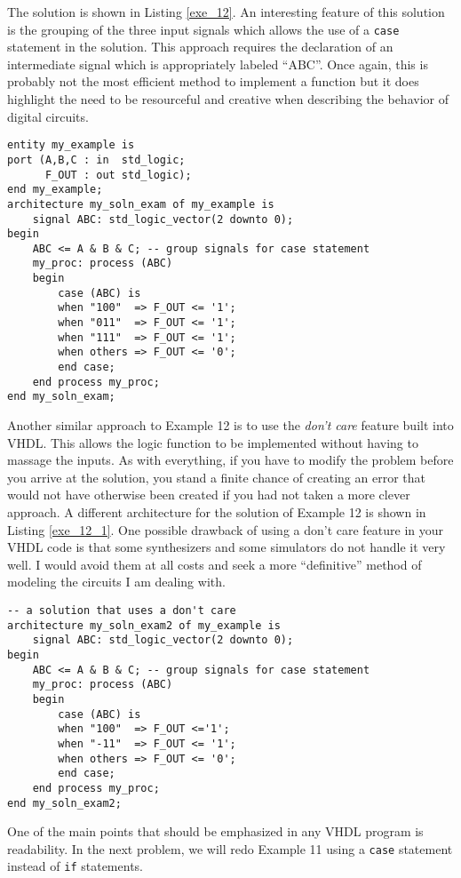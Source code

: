 The solution is shown in Listing \ref{exe_12}. An interesting feature of this solution is the grouping of the three input signals which allows the use of a \texttt{case} statement in the solution. This approach requires the declaration of an intermediate signal which is appropriately labeled ``ABC''. Once again, this is probably not the most efficient method to implement a function but it does highlight the need to be resourceful and creative when describing the behavior of digital circuits.
\begin{lstlisting}[label=exe_12, caption=Solution to Example 12.]
entity my_example is
port (A,B,C : in  std_logic;
      F_OUT : out std_logic);
end my_example;
architecture my_soln_exam of my_example is
	signal ABC: std_logic_vector(2 downto 0);
begin
	ABC <= A & B & C; -- group signals for case statement
	my_proc: process (ABC)
	begin
		case (ABC) is
		when "100"  => F_OUT <= '1';
		when "011"  => F_OUT <= '1';
		when "111"  => F_OUT <= '1';
		when others => F_OUT <= '0';
		end case;
	end process my_proc;
end my_soln_exam;
\end{lstlisting}
Another similar approach to Example 12 is to use the \textit{don't care} feature built into VHDL. This allows the logic function to be implemented without having to massage the inputs. As with everything, if you have to modify the problem before you arrive at the solution, you stand a finite chance of creating an error that would not have otherwise been created if you had not taken a more clever approach. A different architecture for the solution of Example 12 is shown in Listing \ref{exe_12_1}. One possible drawback of using a don't care feature in your VHDL code is that some synthesizers and some simulators do not handle it very well. I would avoid them at all costs and seek a more ``definitive'' method of modeling the circuits I am dealing with.
\begin{lstlisting}[label=exe_12_1, caption=Alternative solution to Example 12.]
-- a solution that uses a don't care
architecture my_soln_exam2 of my_example is
	signal ABC: std_logic_vector(2 downto 0);
begin
	ABC <= A & B & C; -- group signals for case statement
	my_proc: process (ABC)
	begin
		case (ABC) is
		when "100"  => F_OUT <='1';
		when "-11"  => F_OUT <= '1';
		when others => F_OUT <= '0';
		end case;
	end process my_proc;
end my_soln_exam2;
\end{lstlisting}
One of the main points that should be emphasized in any VHDL program is readability. In the next problem, we will redo Example 11 using a \texttt{case} statement instead of \texttt{if} statements.

